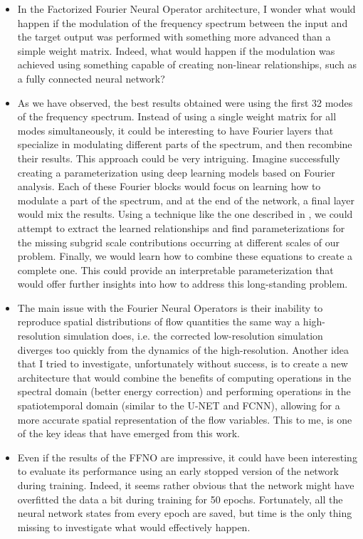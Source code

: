 \begin{itemize}
	\item In the Factorized Fourier Neural Operator architecture, I wonder what would happen if the modulation of the frequency spectrum between the input and the target output was performed with something more advanced than a simple weight matrix. Indeed, what would happen if the modulation was achieved using something capable of creating non-linear relationships, such as a fully connected neural network?
	
\item As we have observed, the best results obtained were using the first 32 modes of the frequency spectrum. Instead of using a single weight matrix for all modes simultaneously, it could be interesting to have Fourier layers that specialize in modulating different parts of the spectrum, and then recombine their results. This approach could be very intriguing. Imagine successfully creating a parameterization using deep learning models based on Fourier analysis. Each of these Fourier blocks would focus on learning how to modulate a part of the spectrum, and at the end of the network, a final layer would mix the results. Using a technique like the one described in \cite{PySR}, we could attempt to extract the learned relationships and find parameterizations for the missing subgrid scale contributions occurring at different scales of our problem. Finally, we would learn how to combine these equations to create a complete one. This could provide an interpretable parameterization that would offer further insights into how to address this long-standing problem.
	
\item The main issue with the Fourier Neural Operators is their inability to reproduce spatial distributions of flow quantities the same way a high-resolution simulation does, i.e. the corrected low-resolution simulation diverges too quickly from the dynamics of the high-resolution. Another idea that I tried to investigate, unfortunately without success, is to create a new architecture that would combine the benefits of computing operations in the spectral domain (better energy correction) and performing operations in the spatiotemporal domain (similar to the U-NET and FCNN), allowing for a more accurate spatial representation of the flow variables. This to me, is one of the key ideas that have emerged from this work.
	
	\item Even if the results of the FFNO are impressive, it could have been interesting to evaluate its performance using an early stopped version of the network during training. Indeed, it seems rather obvious that the network might have overfitted the data a bit during training for 50 epochs. Fortunately, all the neural network states from every epoch are saved, but time is the only thing missing to investigate what would effectively happen.


\end{itemize}
